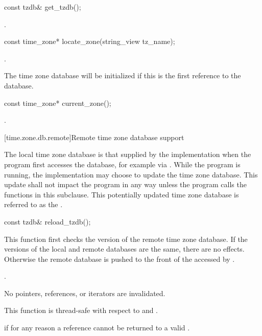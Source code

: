 %
\begin{itemdecl}
const tzdb& get_tzdb();
\end{itemdecl}

\begin{itemdescr}
\pnum
\returns
{}.
\end{itemdescr}

%
\begin{itemdecl}
const time_zone* locate_zone(string_view tz_name);
\end{itemdecl}

\begin{itemdescr}
\pnum
\returns
{}.

\pnum
\begin{note}
The time zone database will be initialized
if this is the first reference to the database.
\end{note}
\end{itemdescr}

%
\begin{itemdecl}
const time_zone* current_zone();
\end{itemdecl}

\begin{itemdescr}
\pnum
\returns
{}.
\end{itemdescr}

[time.zone.db.remote]{Remote time zone database support}

\pnum
The local time zone database
is that supplied by the implementation
when the program first accesses the database,
for example via .
While the program is running,
the implementation may choose to update the time zone database.
This update shall not impact the program in any way
unless the program calls the functions in this subclause.
This potentially updated time zone database
is referred to as the .

%
\begin{itemdecl}
const tzdb& reload_tzdb();
\end{itemdecl}

\begin{itemdescr}
\pnum
\effects
This function first checks
the version of the remote time zone database.
If the versions of the local and remote databases are the same,
there are no effects.
Otherwise the remote database is pushed
to the front of the 
accessed by .

\pnum
\returns
{}.

\pnum
\remarks
No pointers, references, or iterators are invalidated.

\pnum
\remarks
This function is thread-safe with respect to
 and .

\pnum
\throws
{} if for any reason
a reference cannot be returned to a valid .
\end{itemdescr}

